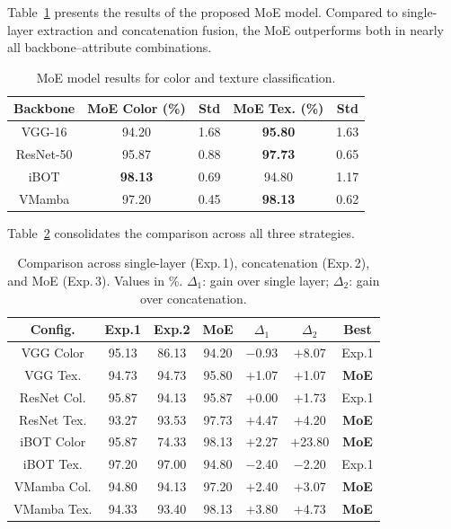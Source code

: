 \documentclass[conference]{IEEEtran}
\begin{document}
Table~\ref{tab_moe} presents the results of the proposed MoE model.
Compared to single-layer extraction and concatenation fusion, the MoE
outperforms both in nearly all backbone--attribute combinations.

\begin{table}[htbp]
\caption{MoE model results for color and texture classification.}
\begin{center}
\begin{tabular}{c|c|c|c|c}
\hline
\textbf{Backbone} & \textbf{MoE Color (\%)} & \textbf{Std}
                  & \textbf{MoE Tex. (\%)} & \textbf{Std} \\
\hline
VGG-16    & 94.20 & 1.68 & \textbf{95.80} & 1.63 \\
ResNet-50 & 95.87 & 0.88 & \textbf{97.73} & 0.65 \\
iBOT      & \textbf{98.13} & 0.69 & 94.80 & 1.17 \\
VMamba    & 97.20 & 0.45 & \textbf{98.13} & 0.62 \\
\hline
\end{tabular}
\label{tab_moe}
\end{center}
\end{table}

Table~\ref{tab_comparacao} consolidates the comparison across all three
strategies.

\begin{table}[htbp]
\caption{Comparison across single-layer (Exp.\,1), concatenation
         (Exp.\,2), and MoE (Exp.\,3). Values in \%. $\Delta_1$: gain
         over single layer; $\Delta_2$: gain over concatenation.}
\begin{center}
\begin{tabular}{c|c|c|c|c|c|c}
\hline
\textbf{Config.} & \textbf{Exp.1} & \textbf{Exp.2}
                 & \textbf{MoE} & \textbf{$\Delta_1$}
                 & \textbf{$\Delta_2$} & \textbf{Best} \\
\hline
VGG Color   & 95.13 & 86.13 & 94.20 & $-$0.93 & $+$8.07  & Exp.1 \\
VGG Tex.    & 94.73 & 94.73 & 95.80 & $+$1.07 & $+$1.07  & \textbf{MoE} \\
ResNet Col. & 95.87 & 94.13 & 95.87 & $+$0.00 & $+$1.73  & Exp.1 \\
ResNet Tex. & 93.27 & 93.53 & 97.73 & $+$4.47 & $+$4.20  & \textbf{MoE} \\
iBOT Color  & 95.87 & 74.33 & 98.13 & $+$2.27 & $+$23.80 & \textbf{MoE} \\
iBOT Tex.   & 97.20 & 97.00 & 94.80 & $-$2.40 & $-$2.20  & Exp.1 \\
VMamba Col. & 94.80 & 94.13 & 97.20 & $+$2.40 & $+$3.07  & \textbf{MoE} \\
VMamba Tex. & 94.33 & 93.40 & 98.13 & $+$3.80 & $+$4.73  & \textbf{MoE} \\
\hline
\end{tabular}
\label{tab_comparacao}
\end{center}
\end{table}
\end{document}
